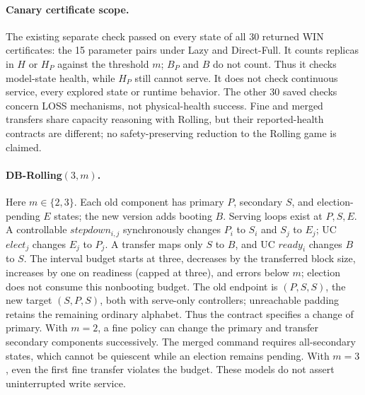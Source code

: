 \paragraph{Canary certificate scope.}
The existing separate check passed on every state of all 30 returned WIN certificates: the 15 parameter pairs under Lazy and Direct-Full. It counts replicas in $H$ or $H_P$ against the threshold $m$; $B_P$ and $B$ do not count. Thus it checks model-state health, while $H_P$ still cannot serve. It does not check continuous service, every explored state or runtime behavior. The other 30 saved checks concern LOSS mechanisms, not physical-health success. Fine and merged transfers share capacity reasoning with Rolling, but their reported-health contracts are different; no safety-preserving reduction to the Rolling game is claimed.

\paragraph{DB-Rolling$(3,m)$.}
Here $m\in\{2,3\}$. Each old component has primary $P$, secondary $S$, and election-pending $E$ states; the new version adds booting $B$. Serving loops exist at $P,S,E$. A controllable $stepdown_{i,j}$ synchronously changes $P_i$ to $S_i$ and $S_j$ to $E_j$; UC $elect_j$ changes $E_j$ to $P_j$. A transfer maps only $S$ to $B$, and UC $ready_i$ changes $B$ to $S$. The interval budget starts at three, decreases by the transferred block size, increases by one on readiness (capped at three), and errors below $m$; election does not consume this nonbooting budget. The old endpoint is $(P,S,S)$, the new target $(S,P,S)$, both with serve-only controllers; unreachable padding retains the remaining ordinary alphabet. Thus the contract specifies a change of primary. With $m=2$, a fine policy can change the primary and transfer secondary components successively. The merged command requires all-secondary states, which cannot be quiescent while an election remains pending. With $m=3$, even the first fine transfer violates the budget. These models do not assert uninterrupted write service.

